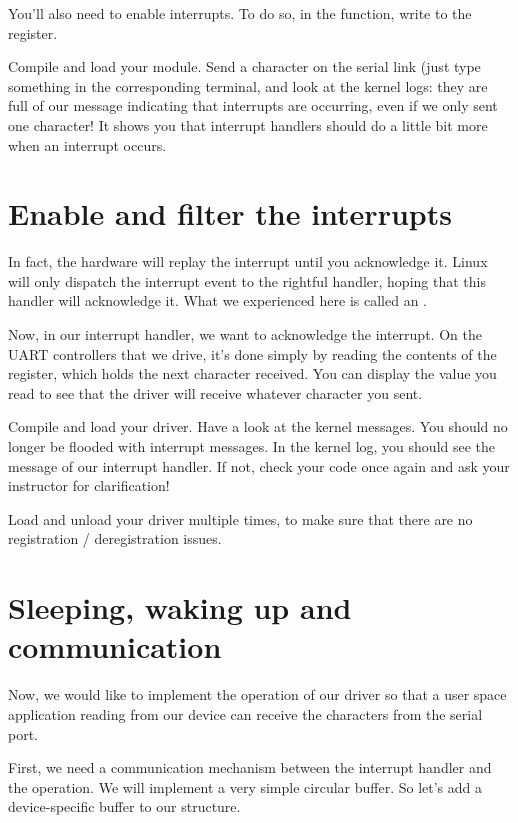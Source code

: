 You'll also need to enable interrupts.
To do so, in the  function, write
 to the  register.

Compile and load your module. Send a character on the serial link (just
type something in the corresponding  terminal, and
look at the kernel logs: they are full of our message indicating that
interrupts are occurring, even if we only sent one character! It shows
you that interrupt handlers should do a little bit more when an
interrupt occurs.

\section{Enable and filter the interrupts}

In fact, the hardware will replay the interrupt until you acknowledge
it. Linux will only dispatch the interrupt event to the rightful
handler, hoping that this handler will acknowledge it. What we
experienced here is called an .

Now, in our interrupt handler, we want to acknowledge the
interrupt. On the UART controllers that we drive, it's done simply by
reading the contents of the  register, which holds the
next character received. You can display the value you read to see
that the driver will receive whatever character you sent.

Compile and load your driver. Have a look at the kernel messages. You
should no longer be flooded with interrupt messages. In the kernel
log, you should see the message of our interrupt handler. If not,
check your code once again and ask your instructor for clarification!

Load and unload your driver multiple times, to make sure that
there are no registration / deregistration issues.

\section{Sleeping, waking up and communication}

Now, we would like to implement the  operation of our
driver so that a user space application reading from our device can
receive the characters from the serial port.

First, we need a communication mechanism between the interrupt handler
and the  operation. We will implement a very simple
circular buffer. So let's add a device-specific buffer to our
 structure.

